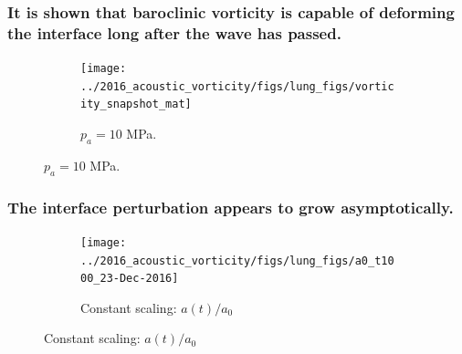 % 
% 
\begin{frame}%
\frametitle{It is shown that baroclinic vorticity is capable of deforming the interface long after the wave has passed.}%
  \begin{figure}
    \centering
    \begin{subfigure}[b]{0.6\textwidth}
      \texttt{[image: ../2016\_acoustic\_vorticity/figs/lung\_figs/vorticity\_snapshot\_mat]}
      \caption{$p_a = 10$ MPa.}
    \end{subfigure}
  \end{figure}
\end{frame}
%
%
\begin{frame}
  \frametitle{The interface perturbation appears to grow asymptotically.}
  \begin{minipage}{0.45\textwidth}
    \begin{figure}
      \centering
      \begin{subfigure}[t]{\textwidth}
        \centering
        \texttt{[image: ../2016\_acoustic\_vorticity/figs/lung\_figs/a0\_t1000\_23-Dec-2016]}
        \caption*{\label{fig:trapz_interface_t1000} Constant scaling:
          $a(t)/a_0$}
      \end{subfigure}
    \end{figure}
    \end{minipage}
    ~
    \begin{minipage}{0.45\textwidth}
    \end{minipage}



\end{frame}
